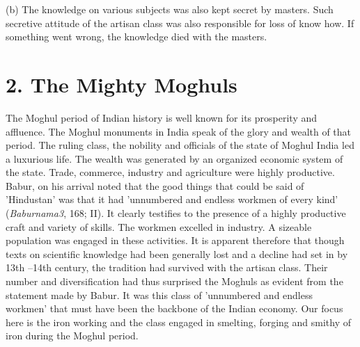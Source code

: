  (b) The knowledge on various subjects was also kept secret by masters. Such secretive attitude of the artisan class was also responsible for loss of know how. If something went wrong, the knowledge died with the masters.

 



\section*{2. The Mighty Moghuls}

The Moghul period of Indian history is well known for its prosperity and affluence. The Moghul monuments in India speak of the glory and wealth of that period. The ruling class, the nobility and officials of the state of Moghul India led a luxurious life. The wealth was generated by an organized economic system of the state. Trade, commerce, industry and agriculture were highly productive. Babur, on his arrival noted that the good things that could be said of 'Hindustan' was that it had 'unnumbered and endless workmen of every kind' (\textit{Baburnama}\textit{3}, 168; II). It clearly testifies to the presence of a highly productive craft and variety of skills. The workmen excelled in industry. A sizeable population was engaged in these activities. It is apparent therefore that though texts on scientific knowledge had been generally lost and a decline had set in by 13th –14th century, the tradition had survived with the artisan class. Their number and diversification had thus surprised the Moghuls as evident from the statement made by Babur. It was this class of 'unnumbered and endless workmen' that must have been the backbone of the Indian economy. Our focus here is the iron working and the class engaged in smelting, forging and smithy of iron during the Moghul period.

